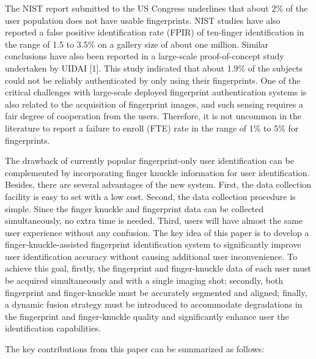 The NIST report submitted to the US Congress \cite{2002SUMMARYON} underlines that about 2\% of the user population does not have usable fingerprints. NIST studies have also reported a false positive identification rate (FPIR) of ten-finger identification in the range of 1.5 to 3.5\% on a gallery size of about one million. Similar conclusions have also been reported in a large-scale proof-of-concept study undertaken by UIDAI [1]. This study indicated that about 1.9\% of the subjects could not be reliably authenticated by only using their fingerprints. One of the critical challenges with large-scale deployed fingerprint authentication systems is also related to the acquisition of fingerprint images, and such sensing requires a fair degree of cooperation from the users. Therefore, it is not uncommon in the literature to report a failure to enroll (FTE) rate in the range of 1\% to 5\% for fingerprints. 

The drawback of currently popular fingerprint-only user identification can be complemented by incorporating finger knuckle information for user identification. Besides, there are several advantages of the new system. First, the data collection facility is easy to set with a low cost. Second, the data collection procedure is simple. Since the finger knuckle and fingerprint data can be collected simultaneously, no extra time is needed. Third, users will have almost the same user experience without any confusion. The key idea of this paper is to develop a finger-knuckle-assisted fingerprint identification system to significantly improve user identification accuracy without causing additional user inconvenience. To achieve this goal, firstly, the fingerprint and finger-knuckle data of each user must be acquired simultaneously and with a single imaging shot; secondly, both fingerprint and finger-knuckle must be accurately segmented and aligned; finally, a dynamic fusion strategy must be introduced to accommodate degradations in the fingerprint and finger-knuckle quality and significantly enhance user the identification capabilities.

The key contributions from this paper can be summarized as follows: 

